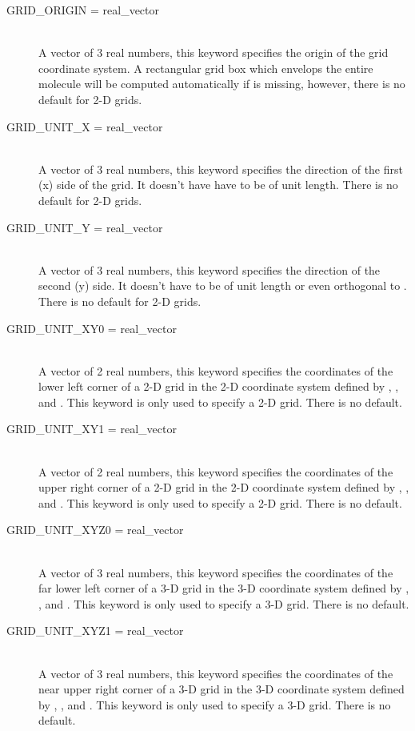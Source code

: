 \begin{description}

\item[GRID\_ORIGIN = real\_vector]\mbox{}\\
A vector of 3 real numbers, this keyword specifies
the origin of the grid coordinate system.
A rectangular grid box which envelops the entire molecule
will be computed automatically if  is missing, however,
there is no default for 2-D grids.

\item[GRID\_UNIT\_X = real\_vector]\mbox{}\\
A vector of 3 real numbers, this keyword specifies
the direction of the first (x) side of the grid.
It doesn't have have to be of unit length.
There is no default for 2-D grids.

\item[GRID\_UNIT\_Y = real\_vector]\mbox{}\\
A vector of 3 real numbers, this keyword specifies
the direction of the second (y) side.
It doesn't have to be of unit length
or even orthogonal to .
There is no default for 2-D grids.

\item[GRID\_UNIT\_XY0 = real\_vector]\mbox{}\\
A vector of 2 real numbers, this keyword specifies
the coordinates of the lower left corner of a 2-D grid in 
the 2-D coordinate system defined by , ,
and . This keyword is only used
to specify a 2-D grid.
There is no default.

\item[GRID\_UNIT\_XY1 = real\_vector]\mbox{}\\
A vector of 2 real numbers, this keyword specifies
the coordinates of the upper right corner of a 2-D grid in 
the 2-D coordinate system defined by , ,
and . This keyword is only used
to specify a 2-D grid.
There is no default.

\item[GRID\_UNIT\_XYZ0 = real\_vector]\mbox{}\\
A vector of 3 real numbers, this keyword specifies
the coordinates of the far lower left corner of a 3-D grid in 
the 3-D coordinate system defined by , ,
and . This keyword is only used
to specify a 3-D grid.
There is no default.

\item[GRID\_UNIT\_XYZ1 = real\_vector]\mbox{}\\
A vector of 3 real numbers, this keyword specifies
the coordinates of the near upper right corner of a 3-D grid in 
the 3-D coordinate system defined by , ,
and . This keyword is only used
to specify a 3-D grid.
There is no default.

\end{description}

